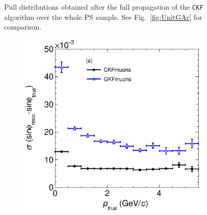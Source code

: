\begin{figure}[t]
\begin{subfigure}{0.32\textwidth}
         \caption{}
         \label{fig:pBiasVSLength2212_Int}
     \end{subfigure}
        \caption{Pull distributions obtained after the full propagation of the \texttt{CKF} algorithm over the whole PS sample. See Fig.~\ref{fig:UnitGAr} for comparison.}
        \label{fig:pRes2DLength_Int}
\end{figure}

\begin{figure}[t]
     \centering
     \begin{subfigure}{0.32\textwidth}
         \centering
         \includegraphics[width=\textwidth]{figures/ch5-KF_NDGAr/FullSample/Int/Angle_Res/sinphi/RessinphiVSp_13.eps}
         \caption{}
         \label{fig:sinphiResVSp13_Int}
     \end{subfigure}
     \begin{subfigure}{0.32\textwidth}
         \centering

\end{subfigure}
\end{figure}
